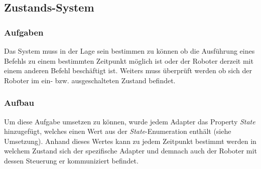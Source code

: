 
\subsection{Zustands-System}

\subsubsection{Aufgaben}
Das System muss in der Lage sein bestimmen zu können ob die Ausführung eines Befehls zu einem bestimmten Zeitpunkt möglich ist oder der Roboter derzeit mit einem anderen Befehl beschäftigt ist. Weiters muss überprüft werden ob sich der Roboter im ein- bzw. ausgeschalteten Zustand befindet.

\subsubsection{Aufbau}
Um diese Aufgabe umsetzen zu können, wurde jedem Adapter das Property \textit{State} hinzugefügt, welches einen Wert aus der \textit{State}-Enumeration enthält (siehe Umsetzung). Anhand dieses Wertes kann zu jedem Zeitpunkt bestimmt werden in welchem Zustand sich der spezifische Adapter und demnach auch der Roboter mit dessen Steuerung er kommuniziert befindet.

